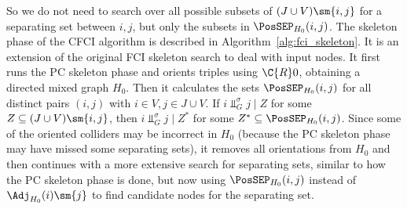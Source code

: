 So we do not need to search over all possible subsets of $(J \cup V) \sm \{i,j\}$ for a separating set between $i,j$, but only the subsets in $\PosSEP_{H_0}(i,j)$.
The skeleton phase of the CFCI algorithm is described in Algorithm~\ref{alg:fci_skeleton}. 
It is an extension of the original FCI skeleton search \cite{SMR1995} to deal with input nodes. 
It first runs the PC skeleton phase and orients triples using $\C{R}0$, obtaining a directed mixed graph $H_0$. 
Then it calculates the sets $\PosSEP_{H_0}(i,j)$ for all distinct pairs $(i,j)$ with $i \in V, j \in J \cup V$.
If $i \Perp^\sigma_G j \mid Z$ for some $Z \subseteq (J \cup V) \sm \{i,j\}$, then
$i \Perp^\sigma_G j \mid Z^*$ for some $Z^* \subseteq \PosSEP_{H_0}(i,j)$.
Since some of the oriented colliders may be incorrect in $H_0$ (because the PC skeleton phase may have missed some separating sets), it removes all orientations from $H_0$ and then continues with a more extensive search for separating sets, similar
to how the PC skeleton phase is done, but now using $\PosSEP_{H_0}(i,j)$ instead of $\Adj_{H_0}(i)\sm\{j\}$ to find candidate nodes for the separating set.

